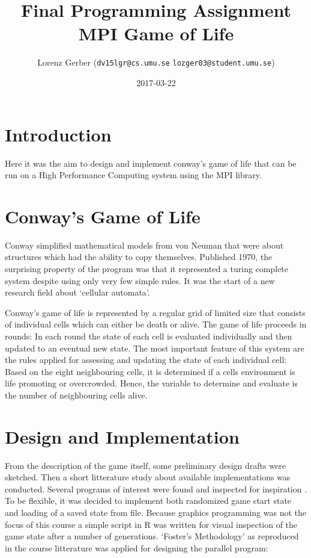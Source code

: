 \documentclass[a4paper,11pt,twoside]{article}
\title{Final Programming Assignment\\ MPI Game of Life}
\author{Lorenz Gerber ({\tt{dv15lgr@cs.umu.se}} {\tt{lozger03@student.umu.se}})}
\date{2017-03-22}
\begin{document}
\lstset{language=C}
\maketitle
\thispagestyle{empty}
\newpage
\tableofcontents
\thispagestyle{empty}
\newpage

\clearpage
{}

\section{Introduction}
Here it was the aim to design and implement conway's game of life that can be run on a High Performance Computing system using the MPI library. 
\section{Conway's Game of Life}
Conway simplified mathematical models from von Neuman that were about structures which had the ability to copy themselves. Published 1970, the surprising property of the program was that it represented a turing complete system despite using only very few simple rules. It was the start of a new research field about `cellular automata'.

Conway's game of life is represented by a regular grid of limited size that consists of individual cells which can either be death or alive. The game of life proceeds in rounds: In each round the state of each cell is evaluated individually and then updated to an eventual new state. The most important feature of this system are the rules applied for assessing and updating the state of each individual cell: Based on the eight neighbouring cells, it is determined if a cells environment is life promoting or overcrowded. Hence, the variable to determine and evaluate is the number of neighbouring cells alive.

\section{Design and Implementation}
From the description of the game itself, some preliminary design drafts were sketched. Then a short litterature study about available implementations was conducted. Several programs of interest were found and inspected for inspiration \cite{golRosetta} \cite{golKTH} \cite{golPetascale}. 
To be flexible, it was decided to implement both randomized game start state and loading of a saved state from file. Because graphics programming was not the focus of this course a simple script in R \cite{rlanguage} was written for visual inspection of the game state after a number of generations. 
`Foster's Methodology' as reproduced in the course litterature \cite[p. 66]{pacheco2011} was applied for designing the parallel program:
\end{document}
